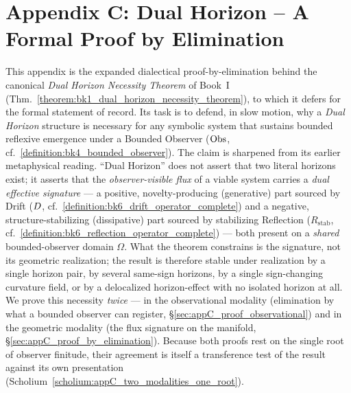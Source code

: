 \clearpage
{}
\chapter*{Appendix C: Dual Horizon – A Formal Proof by Elimination}
\label{sec:appC_dual_horizon}
This appendix is the expanded dialectical proof-by-elimination behind the canonical \emph{Dual Horizon Necessity Theorem} of Book~I (Thm.~\ref{theorem:bk1_dual_horizon_necessity_theorem}), to which it defers for the formal statement of record. Its task is to defend, in slow motion, why a \emph{Dual Horizon} structure is necessary for any symbolic system that sustains bounded reflexive emergence under a Bounded Observer (\(\mathrm{Obs}\), cf.~\ref{definition:bk4_bounded_observer}). The claim is sharpened from its earlier metaphysical reading. ``Dual Horizon'' does not assert that two literal horizons exist; it asserts that the \emph{observer-visible flux} of a viable system carries a \emph{dual effective signature} --- a positive, novelty-producing (generative) part sourced by Drift (\(D\), cf.~\ref{definition:bk6_drift_operator_complete}) and a negative, structure-stabilizing (dissipative) part sourced by stabilizing Reflection (\(R_{\mathrm{stab}}\), cf.~\ref{definition:bk6_reflection_operator_complete}) --- both present on a \emph{shared} bounded-observer domain \(\Omega\). What the theorem constrains is the signature, not its geometric realization; the result is therefore stable under realization by a single horizon pair, by several same-sign horizons, by a single sign-changing curvature field, or by a delocalized horizon-effect with no isolated horizon at all. We prove this necessity \emph{twice} --- in the observational modality (elimination by what a bounded observer can register, \S\ref{sec:appC_proof_observational}) and in the geometric modality (the flux signature on the manifold, \S\ref{sec:appC_proof_by_elimination}). Because both proofs rest on the single root of observer finitude, their agreement is itself a transference test of the result against its own presentation (Scholium~\ref{scholium:appC_two_modalities_one_root}).

